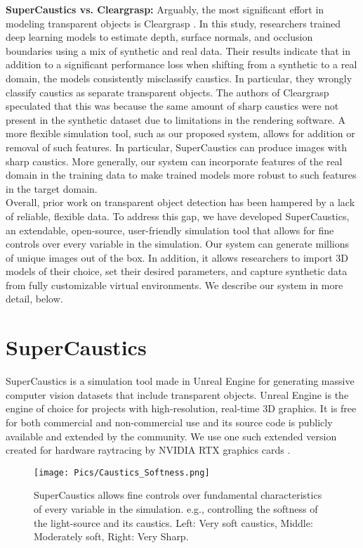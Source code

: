 \documentclass[conference]{IEEEtran}
\begin{document}
\noindent \textbf{SuperCaustics vs. Cleargrasp:} Arguably, the most significant effort in modeling transparent objects is Cleargrasp \cite{cleargrasp}. In this study, researchers trained deep learning models to estimate depth, surface normals, and occlusion boundaries using a mix of synthetic and real data. Their results indicate that in addition to a significant performance loss when shifting from a synthetic to a real domain, the models consistently misclassify caustics. In particular, they wrongly classify caustics as separate transparent objects. The authors of Cleargrasp speculated that this was because the same amount of sharp caustics were not present in the synthetic dataset due to limitations in the rendering software. A more flexible simulation tool, such as our proposed system, allows for addition or removal of such features. In particular, SuperCaustics can produce images with sharp caustics. More generally, our system can incorporate features of the real domain in the training data to make trained models more robust to such features in the target domain.\\

Overall, prior work on transparent object detection has been hampered by a lack of reliable, flexible data. To address this gap, we have developed SuperCaustics, an extendable, open-source, user-friendly simulation tool that allows for fine controls over every variable in the simulation. Our system can generate millions of unique images out of the box. In addition, it allows researchers to import 3D models of their choice, set their desired parameters, and capture synthetic data from fully customizable virtual environments. We describe our system in more detail, below.

\section{SuperCaustics}
\label{sec:SuperCaustics}
SuperCaustics is a simulation tool made in Unreal Engine for generating massive computer vision datasets that include transparent objects. Unreal Engine is the engine of choice for projects with high-resolution, real-time 3D graphics. It is free for both commercial and non-commercial use and its source code is publicly available and extended by the community. We use one such extended version created for hardware raytracing by NVIDIA RTX graphics cards \cite{nvidia-github-repository}.

\begin{figure*}

 \center

  \texttt{[image: Pics/Caustics\_Softness.png]}

  \caption{SuperCaustics allows fine controls over fundamental characteristics of every variable in the simulation. e.g., controlling the softness of the light-source and its caustics. Left: Very soft caustics, Middle: Moderately soft, Right: Very Sharp.}

  \label{Softness}

\end{figure*}
\end{document}
